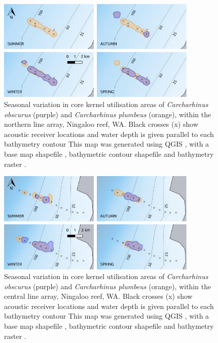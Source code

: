 \documentclass[11pt,a4paper]{article}
\begin{document}
	\newpage
	
	\begin{figure}[h!]
		\centering\includegraphics[width=0.85\textwidth]{../Results/north.pdf}
		\caption{Seasonal variation in core kernel utilisation areas of \textit{Carcharhinus obscurus} (purple) and \textit{Carcharhinus plumbeus} (orange), within the northern line array, Ningaloo reef, WA. Black crosses (x) show acoustic receiver locations and water depth is given parallel to each bathymetry contour This map was generated using QGIS \citep{QGISDevelopmentTeam2019}, with a base map shapefile \citep{AustralianBureauofStatistics2011}, bathymetric contour shapefile \citep{GEBCOCompilationGroup2019} and bathymetry raster \citep{Whiteway2009}.}
		\label{depth_north}
	\end{figure}		
	\begin{figure}[h!]
		\centering\includegraphics[width=0.85\textwidth]{../Results/mid.pdf}
		\caption{Seasonal variation in core kernel utilisation areas of \textit{Carcharhinus obscurus} (purple) and \textit{Carcharhinus plumbeus} (orange), within the central line array, Ningaloo reef, WA. Black crosses (x) show acoustic receiver locations and water depth is given parallel to each bathymetry contour This map was generated using QGIS \citep{QGISDevelopmentTeam2019}, with a base map shapefile \citep{AustralianBureauofStatistics2011}, bathymetric contour shapefile \citep{GEBCOCompilationGroup2019} and bathymetry raster \citep{Whiteway2009}.}
		\label{depth_mid}
	\end{figure}	
\end{document}
